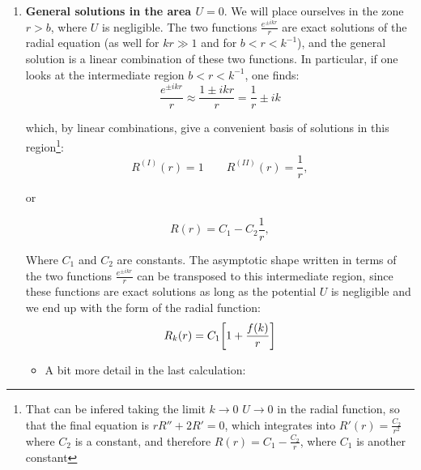 \begin{enumerate}
    \item \textbf{General solutions in the area $U=0$}. We will place ourselves in the zone $r>b$, where $U$ is negligible. The two functions $\frac{e^{\pm ikr}}{r}$ are exact solutions of the radial equation (as well for $kr\gg 1$ and for $b<r<k^{-1}$), and the general solution is a linear combination of these two functions. In particular, if one looks at the intermediate region $b<r<k^{-1}$, one finds:
    \begin{equation}
        \frac{e^{\pm ikr}}{r}\approx \frac{1\pm ikr}{r}=\frac{1}{r}\pm ik
    \end{equation}

    which, by linear combinations, give a convenient basis of solutions in this region\footnote{That can be infered taking the limit $k\to 0$ $U\to 0$ in the radial function, so that the final equation is $rR''+2R'=0$, which integrates into $R'(r)=\frac{C_2}{r^2}$ where $C_2$ is a constant, and therefore $R(r)=C_1-\frac{C_2}{r}$, where $C_1$ is another constant}:
    \begin{equation}
        R^{(I)}(r)=1\qquad R^{(II)}(r)=\frac{1}{r},
    \end{equation}

    or

    \begin{equation}
        R(r)=C_1-C_2\frac{1}{r},
    \end{equation}

    Where $C_1$ and $C_2$ are constants. The asymptotic shape written in terms of the two functions $\frac{e^{\pm ikr}}{r}$ can be transposed to this intermediate region, since these functions are exact solutions as long as the potential $U$ is negligible and we end up with the form of the radial function:
    \begin{equation}
        R_k(r) = C_1\qty[1+\frac{f(k)}{r}]
    \end{equation}
    \begin{itemize}
        \item A bit more detail in the last calculation:
        

\end{itemize}
\end{enumerate}
